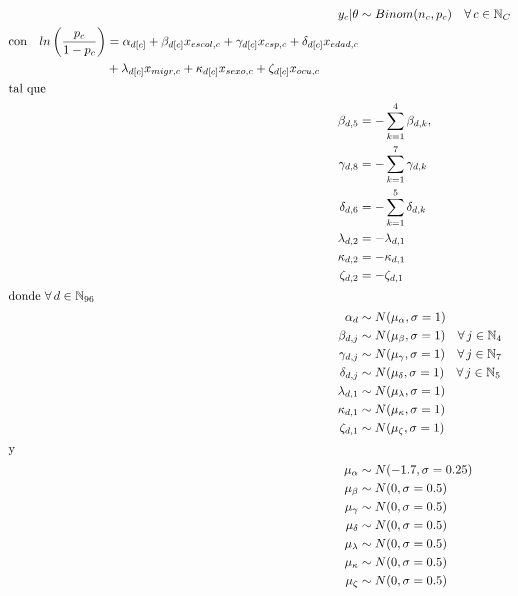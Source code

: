 \begin{align}\label{eq:Modelo_Comp_EF}
y_c|\theta & \sim Binom(n_c,p_c) \quad \forall \, c \in \mathbb{N}_C \nonumber \\
\begin{split}
\text{con} \quad ln\left(\dfrac{p_c}{1-p_c}\right) &= \alpha_{d[c]} + \beta_{d[c]} x_{escol,c} + \gamma_{d[c]} x_{csp,c} + \delta_{d[c]} x_{edad,c} \\
&+ \lambda_{d[c]} x_{migr,c} + \kappa_{d[c]} x_{sexo,c} + \zeta_{d[c]} x_{ocu,c} 
\end{split}\\
\intertext{tal que} 
\beta_{d,5} &= -\sum\limits_{k = 1}^{4} \beta_{d,k}, \nonumber \\
\gamma_{d,8} &= -\sum\limits_{k = 1}^{7} \gamma_{d,k} \nonumber \\
\delta_{d,6} &= -\sum\limits_{k = 1}^{5} \delta_{d,k} \nonumber \\
\lambda_{d,2} &= -\lambda_{d,1} \nonumber \\
\kappa_{d,2} &= -\kappa_{d,1} \nonumber \\
\zeta_{d,2} &= -\zeta_{d,1} \nonumber \\
\intertext{donde $\forall \, d \in \mathbb{N}_{96}$}
\alpha_d &\sim N(\mu_{\alpha}, \sigma=1) \quad  \nonumber \\
\beta_{d,j} &\sim N(\mu_{\beta}, \sigma=1) \quad \forall \, j \in \mathbb{N}_{4} \nonumber \\
\gamma_{d,j} &\sim N(\mu_{\gamma}, \sigma=1) \quad \forall \, j \in \mathbb{N}_{7} \nonumber \\
\delta_{d,j} &\sim N(\mu_{\delta}, \sigma=1) \quad \forall \, j \in \mathbb{N}_{5}  \nonumber \\ 
\lambda_{d,1} &\sim N(\mu_{\lambda}, \sigma=1) \nonumber \\
\kappa_{d,1} &\sim N(\mu_{\kappa}, \sigma=1) \nonumber \\ 
\zeta_{d,1} &\sim N(\mu_{\zeta}, \sigma=1) \nonumber \\
\intertext{y}
\mu_{\alpha} &\sim N(-1.7,\sigma=0.25) \nonumber \\
\mu_{\beta} &\sim N(0,\sigma=0.5) \nonumber \\
\mu_{\gamma} &\sim N(0,\sigma=0.5) \nonumber \\
\mu_{\delta} &\sim N(0,\sigma=0.5) \nonumber \\
\mu_{\lambda} &\sim N(0,\sigma=0.5) \nonumber \\
\mu_{\kappa} &\sim N(0,\sigma=0.5) \nonumber \\
\mu_{\zeta} &\sim N(0,\sigma=0.5) \nonumber
\end{align}

